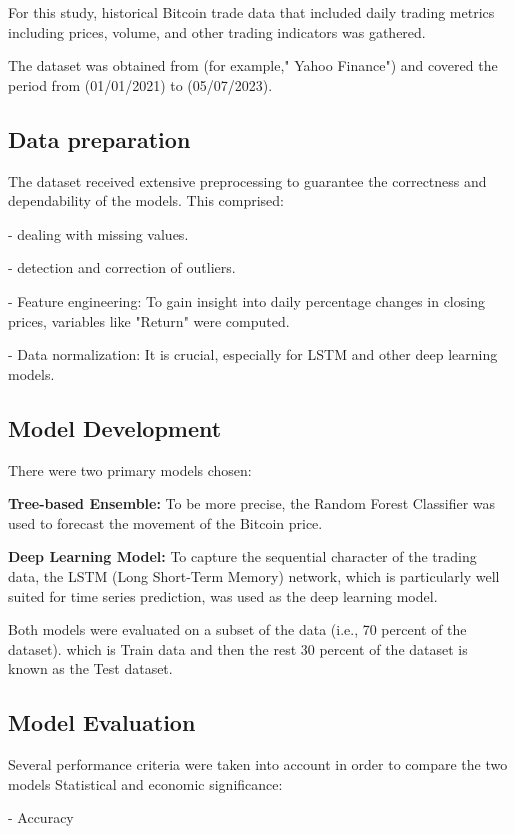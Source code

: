 For this study, historical Bitcoin trade data that included daily trading metrics including prices, volume, and other trading indicators was gathered.

The dataset was obtained from (for example," Yahoo Finance") and covered the period from (01/01/2021) to (05/07/2023).

\subsection{Data preparation}

The dataset received extensive preprocessing to guarantee the correctness and dependability of the models. This comprised:

-	dealing with missing values.

-	detection and correction of outliers.

-	Feature engineering: To gain insight into daily percentage changes in closing prices, 
variables like "Return" were computed.

-	Data normalization: It is crucial, especially for LSTM and other deep learning models.

\subsection{Model Development }

There were two primary models chosen:

\textbf{Tree-based Ensemble:} To be more precise, the Random Forest Classifier was used to forecast the movement of the Bitcoin price.

\textbf{Deep Learning Model:} To capture the sequential character of the trading data, the LSTM (Long Short-Term Memory) network, which is particularly well suited for time series prediction, was used as the deep learning model.

Both models were evaluated on a subset of the data (i.e., 70 percent of the dataset). which is Train data and then the rest 30 percent of the dataset is known as the Test dataset.

\subsection{Model Evaluation}

Several performance criteria were taken into account in order to compare the two models
Statistical and economic significance:

-	Accuracy

